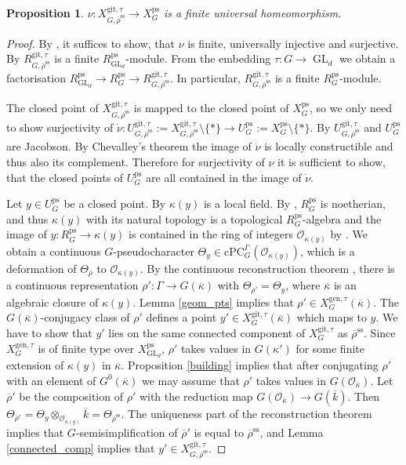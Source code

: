 \documentclass{amsart}
\newtheorem{prop}{Proposition}[section]
\theoremstyle{definition}
\theoremstyle{remark}
\newcommand{\stackcite}[1]{\cite[\href{https://stacks.math.columbia.edu/tag/#1}{Tag #1}]{stacks-project}}
\DeclareMathOperator{\GL}{GL}
\newcommand{\OO}{\mathcal O}
\newcommand{\rhobar}{\overline{\rho}}
\newcommand{\ps}{\mathrm{ps}}
\newcommand{\gen}{\mathrm{gen}}
\newcommand{\gps}{\mathrm{git}}
\newcommand{\kappabar}{\overline{\kappa}}
\newcommand{\RpsGLd}{R^{\ps}_{\GL_d}}
\newcommand{\RpsG}{R^{\ps}_G}
\newcommand{\kbar}{\overline{k}}
\newcommand{\rhobarss}{\rhobar^{\mathrm{ss}}}
\newcommand{\cPC}{\mathrm{cPC}}
\newcommand{\git}{\mathrm{git}}
\begin{document}
\begin{prop}\label{nu_fin_u} $\nu : X^{\gps,\tau}_{G,\rhobarss} \to X^{\ps}_G$ is a finite universal homeomorphism.
\end{prop} 

\begin{proof}
    By \stackcite{04DF}, it suffices to show, that $\nu$ is finite, universally injective and surjective.
    By  $R_{G,\rhobarss}^{\gps,\tau}$ is a finite $\RpsGLd$-module.
    From the embedding $\tau : G \to \GL_d$ we obtain a factorisation $\RpsGLd \to R^{\ps}_G \to R^{\gps,\tau}_{G,\rhobarss}$.
    In particular, $R^{\gps,\tau}_{G,\rhobarss}$ is a finite $R^{\ps}_G$-module.

    The closed point of $X^{\gps,\tau}_{G,\rhobarss}$ is mapped to the closed point of $X^{\ps}_G$, so we only need to show surjectivity of $\dot \nu : U^{\gps,\tau}_{G, \rhobarss} := X^{\gps,\tau}_{G,\rhobarss} \setminus \{*\} \to U^{\ps}_{G} := X^{\ps}_G \setminus \{*\}$. By \stackcite{02J6} $U^{\gps,\tau}_{G, \rhobarss}$ and $U^{\ps}_{G}$ are Jacobson. By Chevalley's theorem \stackcite{054K} the image of $\dot \nu$ is locally constructible and thus also its complement. Therefore for surjectivity of $\nu$ it is sufficient to show, that the closed points of $U^{\ps}_{G}$ are all contained in the image of $\dot\nu$.

Let $y \in U^{\ps}_{G}$ be a closed point.
    By \cite[Lemma 3.17]{BIP_new} $\kappa(y)$ is a local field. 
    By \cite[Theorem 5.7]{quast}, $R^{\ps}_G$ is noetherian, and thus $\kappa(y)$ with its natural topology is a topological $\RpsG$-algebra and the image of $y: \RpsG \rightarrow \kappa(y)$ 
    is contained in the ring of integers $\OO_{\kappa(y)}$ by \cite[Lemma 3.17]{BIP_new}. 
    We obtain a continuous $G$-pseudocharacter $\Theta_y \in \cPC_G^{\Gamma}(\OO_{\kappa(y)})$, which is a deformation 
    of $\Theta_{\rhobar}$ to $\OO_{\kappa(y)}$. By the continuous reconstruction theorem 
    \cite[Theorem 3.8]{quast}, there is a continuous representation $\rho' : \Gamma \to G(\overline{\kappa})$ with $\Theta_{\rho'} = \Theta_y$, where $\kappabar$ is an algebraic closure of $\kappa(y)$. Lemma \ref{geom_pts}
    implies that $\rho'\in X^{\gen, \tau}_G(\overline{\kappa})$. The $G(\kappabar)$-conjugacy class of $\rho'$ defines a point $y'\in X^{\git,\tau}_G(\kappabar)$ which maps to $y$. We have to show that $y'$ lies on 
    the same connected component of $X^{\git, \tau}_G$ as $\rhobarss$. Since $X^{\gen,\tau}_G$ is of finite 
    type over $X^{\ps}_{\GL_d}$, $\rho'$ takes values in $G(\kappa')$ for some finite 
    extension of $\kappa(y)$ in $\kappabar$. Proposition \ref{building}
    implies that after conjugating $\rho'$ with an element of $G^0(\kappabar)$ we may assume 
    that $\rho'$ takes values in $G(\OO_{\kappabar})$. Let $\rhobar'$ be the composition 
    of $\rho'$ with the reduction map $G(\OO_{\kappabar})\rightarrow G(\kbar)$. Then 
    $\Theta_{\rhobar'}= \Theta_y\otimes_{\OO_{\kappa(y)}} \kbar = \Theta_{\rhobarss}$. 
    The uniqueness part of the reconstruction theorem \cite[Theorem 3.7]{quast} implies that $G$-semisimplification 
    of $\rhobar'$ is equal to $\rhobarss$, and Lemma \ref{connected_comp} implies that 
    $y'\in X^{\git,\tau}_{G, \rhobarss}$.


\end{proof}
\end{document}
